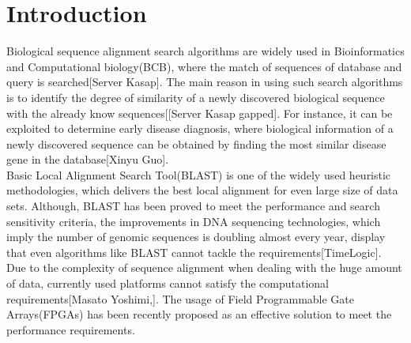 \section{Introduction}
\label{sec:introduction}


Biological sequence alignment search algorithms are widely used in Bioinformatics and Computational biology(BCB), where the match of sequences of database and query is searched[Server Kasap]. The main reason in using such search algorithms is to identify the degree of similarity of a newly discovered biological sequence with the already know sequences[[Server Kasap gapped]. For instance, it can be exploited to determine early disease diagnosis, where biological information of a newly discovered sequence can be obtained by finding the most similar disease gene in the database[Xinyu Guo].
\\
Basic Local Alignment Search Tool(BLAST) is one of the widely used heuristic methodologies, which delivers the best local alignment for even large size of data sets. Although, BLAST has been proved to meet the performance and search sensitivity criteria, the improvements in DNA sequencing technologies, which imply the number of genomic sequences is doubling almost every year, display that even algorithms like BLAST cannot tackle the requirements[TimeLogic]. 
\\
Due to the complexity of sequence alignment when dealing with the huge amount of data, currently used platforms cannot satisfy the computational requirements[Masato Yoshimi,]. The usage of Field Programmable Gate Arrays(FPGAs) has been recently proposed as an effective solution to meet the performance requirements. 


